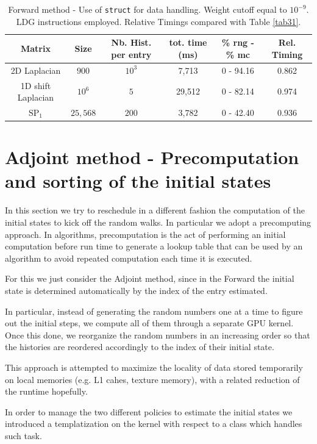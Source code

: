 \documentclass[a4paper,10pt]{article}
\begin{document}
\begin{table}[!h]
\hspace*{-1cm}
\begin{tabular}{|c|c|c|c|c|c|}
\hline
\textbf{Matrix} & \textbf{Size} &\textbf{Nb. Hist. per entry} & tot. time 
(ms) & \% rng - 
\% mc  & Rel. Timing\\
\hline
2D Laplacian& $900$ & $10^3$ & 7,713 & 0 - 94.16 & 0.862\\
\hline 
1D shift Laplacian& $10^6$ & $5$ & 29,512 & 0 - 82.14 & 0.974\\
\hline
$\text{SP}_1$ & $25,568$ & $200$ & 3,782 & 0 - 42.40 & 0.936\\
\hline
\end{tabular}
\caption{Forward method - Use of \texttt{struct} for data handling. Weight 
cutoff equal to $10^{-9}$. LDG instructions employed. Relative Timings compared 
with Table 
\ref{tab31}.}
\label{tab43}
\end{table}

\section{Adjoint method - Precomputation and sorting of the initial states}
In this section we try to reschedule in a different fashion the computation of 
the initial states to kick off the random walks. In particular we adopt a 
precomputing approach. In algorithms, precomputation is the act of performing an 
initial computation before run time to generate a lookup table that can be used 
by an algorithm to avoid repeated computation each time it is executed. 

For this we just consider the Adjoint method, since in the Forward the initial 
state is determined automatically by the index of the entry estimated. \newline

In particular, instead of generating the random numbers one at a time to 
figure out the initial steps, we compute all of them through a separate GPU 
kernel. Once this done, we reorganize the random numbers in an increasing order 
so that the histories are reordered accordingly to the index of their 
initial state. 

This approach is attempted to maximize the locality of data stored temporarily 
on local memories (e.g. L1 cahes, texture memory), with a related reduction of 
the runtime hopefully. 

In order to manage the two different policies to estimate the initial states we 
introduced a templatization on the kernel with respect to a class which handles 
such task.
\end{document}
